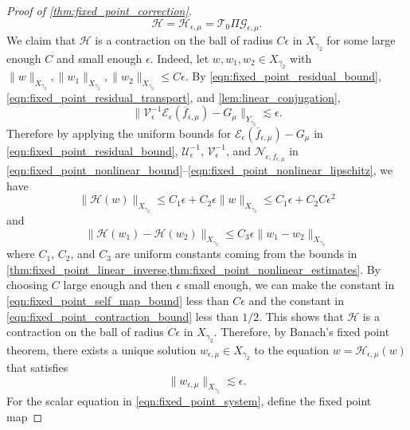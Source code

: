 \documentclass[11pt]{amsart}
\theoremstyle{definition}
\theoremstyle{remark}
\numberwithin{equation}{section}
\newcommand{\mc}[1]{\mathcal{#1}}
\newcommand{\ov}[1]{\overline{#1}}
\begin{document}
\begin{proof}[Proof of \cref{thm:fixed_point_correction}]
\begin{equation}\label{eqn:fixed_point_map}
\mc{H} = \mc{H}_{\epsilon, \mu} = \mc{T}_0\Pi\mc{G}_{\epsilon, \mu}.
\end{equation}
We claim that $\mc{H}$ is a contraction on the ball of radius $C\epsilon$ in $X_{\gamma_2}$ for some large enough $C$ and small enough $\epsilon$. Indeed, let $w, w_1, w_2 \in X_{\gamma_2}$ with $\|w\|_{X_{\gamma_2}}, \|w_1\|_{X_{\gamma_2}}, \|w_2\|_{X_{\gamma_2}} \leq C\epsilon$. By \eqref{eqn:fixed_point_residual_bound}, \eqref{eqn:fixed_point_residual_transport}, and \cref{lem:linear_conjugation}, 
\begin{equation}\label{eqn:fixed_point_conjugated_residual_bound}
\|\mc{V}_\epsilon^{-1} \mc{E}_\epsilon(\ov{f}_{\epsilon, \mu}) - G_\mu\|_{Y_{\gamma_2}} \lesssim \epsilon.
\end{equation}
Therefore by applying the uniform bounds for $\mc{E}_\epsilon(\ov{f}_{\epsilon, \mu}) - G_\mu$ in \eqref{eqn:fixed_point_residual_bound}, $\mc{U}_\epsilon^{-1}$, $\mc{V}_\epsilon^{-1}$, and $\mc{N}_{\epsilon, \ov{f}_{\epsilon, \mu}}$ in \eqref{eqn:fixed_point_nonlinear_bound}--\eqref{eqn:fixed_point_nonlinear_lipschitz}, we have
\begin{equation}\label{eqn:fixed_point_self_map_bound}
\|\mc{H}(w)\|_{X_{\gamma_2}} \leq C_{1}\epsilon + C_{2}\epsilon \|w\|_{X_{\gamma_2}} \leq C_1\epsilon + C_2 C\epsilon^2
\end{equation}
and 
\begin{equation}\label{eqn:fixed_point_contraction_bound}
\|\mc{H}(w_1) - \mc{H}(w_2)\|_{X_{\gamma_2}} \leq C_3\epsilon \|w_1 - w_2\|_{X_{\gamma_2}}
\end{equation}
where $C_1$, $C_2$, and $C_3$ are uniform constants coming from the bounds in \cref{thm:fixed_point_linear_inverse,thm:fixed_point_nonlinear_estimates}. By choosing $C$ large enough and then $\epsilon$ small enough, we can make the constant in \eqref{eqn:fixed_point_self_map_bound} less than $C\epsilon$ and the constant in \eqref{eqn:fixed_point_contraction_bound} less than $1/2$. This shows that $\mc{H}$ is a contraction on the ball of radius $C\epsilon$ in $X_{\gamma_2}$. Therefore, by Banach's fixed point theorem, there exists a unique solution $w_{\epsilon, \mu} \in X_{\gamma_2}$ to the equation $w = \mc{H}_{\epsilon, \mu}(w)$ that satisfies
\begin{equation}\label{eqn:fixed_point_solution_bound}
\|w_{\epsilon, \mu}\|_{X_{\gamma_2}} \lesssim \epsilon.
\end{equation}
For the scalar equation in \eqref{eqn:fixed_point_system}, define the fixed point map

\end{proof}
\end{document}
